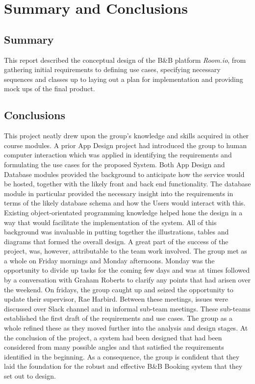\chapter{Summary and Conclusions} \label{conclusion}

\section{Summary}
This report described the conceptual design of the B\&B platform \textit{Room.io}, from gathering initial requirements to defining use cases, specifying necessary sequences and classes up to laying out a plan for implementation and providing mock ups of the final product.

\section{Conclusions}

This project neatly drew upon the group's knowledge and skills acquired in other course modules. A prior App Design project had introduced the group to human computer interaction which was applied in identifying the requirements and formulating the use cases for the proposed System. Both App Design and Database modules provided the background to anticipate how the service would be hosted, together with the likely front and back end functionality. The database module in particular provided the necessary insight into the requirements in terms of the likely database schema and how the Users would interact with this. Existing object-orientated programming knowledge helped hone the design in a way that would facilitate the implementation of the system. All of this background was invaluable in putting together the illustrations, tables and diagrams that formed the overall design. A great part of the success of the project, was, however, attributable to the team work involved. The group met as a whole on Friday mornings and Monday afternoons. Monday was the opportunity to divide up tasks for the coming few days and was at times followed by a conversation with Graham Roberts to clarify any points that had arisen over the weekend. On fridays, the group caught up and seized the opportunity to update their supervisor, Rae Harbird. Between these meetings, issues were discussed over Slack channel and in informal sub-team meetings. These sub-teams established the first draft of the requirements and use cases. The group as a whole refined these as they moved further into the analysis and design stages. At the conclusion of the project, a system had been designed that had been considered from many possible angles and that satisfied the requirements identified in the beginning. As a consequence, the group is confident that they laid the foundation for the robust and effective B\&B Booking system that they set out to design.


